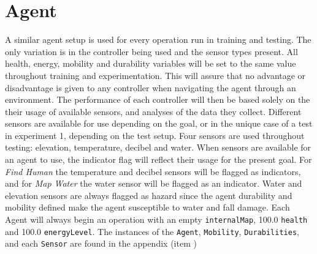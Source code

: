 \section{Agent} \label{sec:agent_setups}
A similar agent setup is used for every operation run in training and testing.
The only variation is in the controller being used and the sensor types present.
All health, energy, mobility and durability variables will be set to the same value throughout training and experimentation.
This will assure that no advantage or disadvantage is given to any controller when navigating the agent through an environment.
The performance of each controller will then be based solely on the their usage of available sensors, and analyses of the data they collect.
Different sensors are available for use depending on the goal, or in the unique case of a test in experiment 1, depending on the test setup.
Four sensors are used throughout testing: elevation, temperature, decibel and water.
When sensors are available for an agent to use, the indicator flag will reflect their usage for the present goal.
For \textit{Find Human} the temperature and decibel sensors will be flagged as indicators, and for \textit{Map Water} the water sensor will be flagged as an indicator.
Water and elevation sensors are always flagged as hazard since the agent durability and mobility defined make the agent susceptible to water and fall damage.
Each Agent will always begin an operation with an empty \texttt{internalMap}, 100.0 \texttt{health} and 100.0 \texttt{energyLevel}.
The instances of the \texttt{Agent}, \texttt{Mobility}, \texttt{Durabilities}, and each \texttt{Sensor} are found in the appendix (item )


